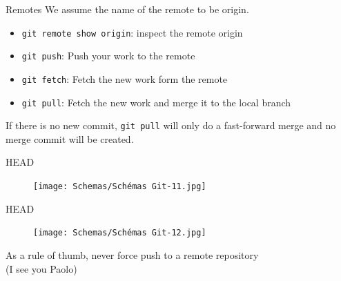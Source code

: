 \documentclass[10pt,aspectratio=169]{beamer}
\begin{document}
\begin{frame}[fragile]{Remotes}
    We assume the name of the remote to be origin.
    \begin{itemize}
        \item \verb|git remote show origin|: inspect the remote origin
        \item \verb|git push|: Push your work to the remote
        \item \verb|git fetch|: Fetch the new work form the remote
        \item \verb|git pull|: Fetch the new work and merge it to the local branch
    \end{itemize}

    If there is no new commit, \verb|git pull| will only do a fast-forward merge and no merge commit will be created.
\end{frame}

\begin{frame}[fragile]{HEAD}
    \begin{figure}
        \texttt{[image: Schemas/Schémas Git-11.jpg]}
    \end{figure}
\end{frame}

\begin{frame}[fragile]{HEAD}
    \begin{figure}
        \texttt{[image: Schemas/Schémas Git-12.jpg]}
    \end{figure}
\end{frame}

{
\begin{frame}
    As a rule of thumb, never force push to a remote repository\\(I see you Paolo)
\end{frame}
}
\end{document}
